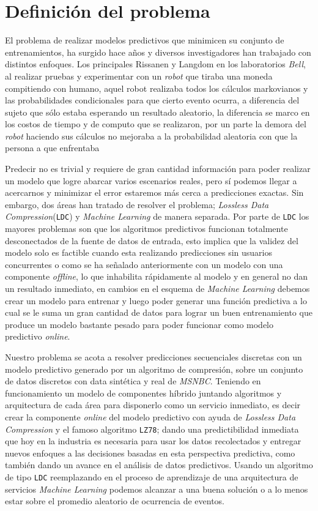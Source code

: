

\section{Definición del problema}


El problema de realizar modelos predictivos que minimicen su conjunto de entrenamientos, ha surgido hace años y diversos investigadores han trabajado con distintos enfoques. Los principales Rissanen\cite{Rissanen1983} y Langdom\cite{Langdon1983} en los laboratorios \emph{Bell}, al realizar pruebas y experimentar con un \emph{robot} que tiraba una moneda compitiendo con humano, aquel robot realizaba todos los cálculos {markovianos} y las probabilidades condicionales para que cierto evento ocurra, a diferencia del sujeto que sólo estaba esperando un resultado aleatorio, la diferencia se marco en los costos de tiempo y de computo que se realizaron, por un parte la demora del \emph{robot} haciendo sus cálculos no mejoraba a la probabilidad aleatoria con que la persona a que enfrentaba 

Predecir no es trivial y requiere de gran cantidad información para poder realizar un modelo que logre abarcar varios escenarios reales, pero sí podemos llegar a acercarnos y minimizar el error  estaremos más cerca a predicciones exactas. Sin embargo, dos áreas han tratado de resolver el problema;  \emph{Lossless Data Compression}(\texttt{LDC}) y \emph{Machine Learning} de manera separada. Por parte de \texttt{LDC} los mayores problemas son que los algoritmos predictivos  funcionan totalmente desconectados de la fuente de datos de entrada, esto implica que la validez del modelo solo es factible cuando esta realizando predicciones sin usuarios concurrentes o como se ha señalado anteriormente con un modelo con una componente \emph{offline}, lo que inhabilita rápidamente al modelo y en general no dan un resultado inmediato, en cambios en el esquema de \emph{Machine Learning} debemos crear un modelo para entrenar y luego poder generar una función predictiva a lo cual se le suma un gran cantidad de datos para lograr un buen entrenamiento que produce un modelo bastante pesado para poder funcionar como modelo predictivo \emph{online}. 

Nuestro problema se acota a resolver predicciones secuenciales discretas con un modelo predictivo generado por un algoritmo de compresión, sobre un conjunto de datos discretos con data sintética y real de \emph{MSNBC}\cite{Claude2014}. Teniendo en funcionamiento un modelo de componentes híbrido juntando algoritmos y arquitectura de cada área para disponerlo como un servicio inmediato, es decir crear la componente \emph{online} del modelo predictivo con ayuda de \emph{Lossless Data Compression} y el famoso algoritmo \texttt{LZ78}; dando una predictibilidad inmediata que hoy en la industria es necesaria para usar los datos recolectados y entregar nuevos enfoques a las decisiones basadas en esta perspectiva predictiva, como también dando un avance en el análisis de datos predictivos. Usando un algoritmo de tipo \texttt{LDC} reemplazando en el proceso de aprendizaje de una arquitectura de  servicios  \emph{Machine Learning} podemos alcanzar a una buena solución o a lo menos estar sobre el promedio aleatorio de ocurrencia de eventos.

